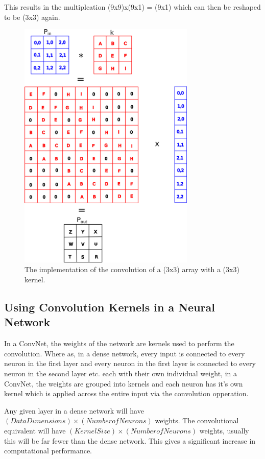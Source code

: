 This results in the multiplcation (9x9)x(9x1) = (9x1) which can then be reshaped to be (3x3) again.

\begin{figure}
	\centering	\includegraphics[width=0.75\textwidth]{Figs/intro2dl/convolutionImplementation.png}
	\caption{The implementation of the convolution of a (3x3) array with a (3x3) kernel.}
	\label{fig:convImpl}
\end{figure}

\subsection{Using Convolution Kernels in a Neural Network}
In a ConvNet, the weights of the network are kernels used to perform the convolution. Where as, in a dense network, every input is connected to every neuron in the first layer and every neuron in the first layer is connected to every neuron in the second layer etc. each with their own individual weight, in a ConvNet, the weights are grouped into kernels and each neuron has it's own kernel which is applied across the entire input via the convolution opperation.

Any given layer in a dense network will have $(Data Dimensions) \times (Number of Neurons)$ weights. The convolutional equivalent will have $(Kernel Size) \times (Number of Neurons)$ weights, usually this will be far fewer than the dense network. This gives a significant increase in computational performance.

